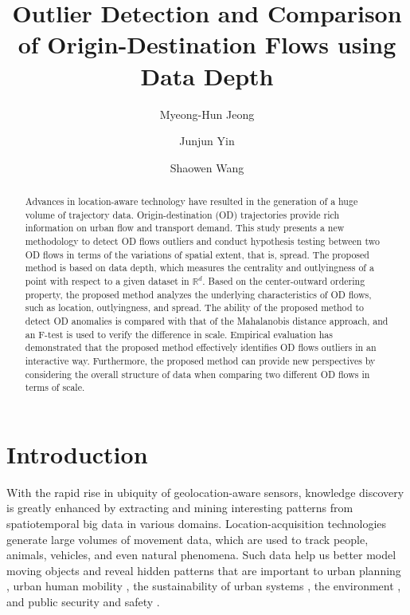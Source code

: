 \documentclass[a4paper,UKenglish]{lipics-v2018}
\title{Outlier Detection and Comparison of Origin-Destination Flows using Data Depth}
\author{Myeong-Hun Jeong}{Department of Civil Engineering, Chosun University, Gwangju, Republic of Korea}{mhjeong@chosun.ac.kr}{[orcid]}{[funding]}
\author{Junjun Yin}{Social Science Research Institute; Institute for CyberScience, Penn State University, PA, USA}{jyin@psu.edu}{[0000-0002-4196-2439]}{[This work used the Extreme Science and Engineering Discovery Environment (XSEDE), which is supported by National Science Foundation grant number ACI-1548562]}
\author{Shaowen Wang}{Department of Geography and Geographic Information Science, University of Illinois at Urbana-Champaign, IL, USA}{shaowen@illinois.edu}{[orcid]}{[funding]}
\begin{document}
\maketitle

\begin{abstract}
Advances in location-aware technology have resulted in the generation of  a huge volume of trajectory data. Origin-destination (OD) trajectories provide rich information on urban flow and transport demand. This study presents a new methodology to detect OD flows outliers and conduct hypothesis testing between two OD flows in terms of the variations of spatial extent, that is, spread. The proposed method is based on data depth, which measures the centrality and outlyingness of a point with respect to a given dataset in $\mathbb{R}^d$. Based on the center-outward ordering property, the proposed method analyzes the underlying characteristics of OD flows, such as location, outlyingness, and  spread. The ability of the proposed method to detect OD anomalies is compared with that of the Mahalanobis distance approach, and an F-test is used to verify the difference in scale. Empirical evaluation has demonstrated that the proposed method effectively identifies  OD flows outliers in an interactive way. Furthermore, the proposed method  can provide new perspectives by considering the overall structure of data when comparing two different OD flows in terms of scale. 

 \end{abstract}

\section{Introduction}
With the rapid rise in ubiquity of geolocation-aware sensors, knowledge discovery is greatly enhanced by extracting and mining interesting patterns from spatiotemporal big data in various domains.
Location-acquisition technologies generate large volumes of movement data, which are used to track people, animals, vehicles, and even natural phenomena.
Such data help us better model moving objects and reveal hidden patterns that are important to urban planning \cite{mazimpaka15AGILE}, urban human mobility \cite{yin2017depicting,kwan1998space}, the sustainability of urban systems \cite{alberti2003integrating,chen13Percom}, the environment \cite{devarakonda13SIGKDD}, and public security and safety \cite{buchin14JOSIS}.
\end{document}
